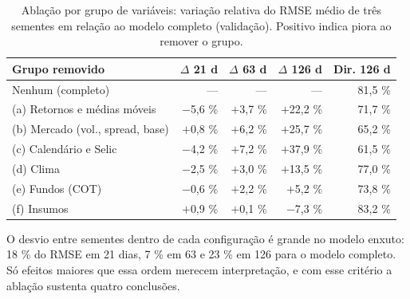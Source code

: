 \begin{table}[htb]
	\centering
	\caption{Ablação por grupo de variáveis: variação relativa do RMSE médio de três sementes em relação ao modelo completo (validação). Positivo indica piora ao remover o grupo.}\label{tab:rq1-ablacao}
	\footnotesize
	\setlength{\tabcolsep}{4pt}
	\begin{tabular}{l r r r r}
		\hline
		\textbf{Grupo removido} & \textbf{$\Delta$ 21 d} & \textbf{$\Delta$ 63 d} & \textbf{$\Delta$ 126 d} & \textbf{Dir. 126 d} \\ \hline
		Nenhum (completo)          & ---     & ---    & ---     & 81,5 \% \\
		(a) Retornos e médias móveis & $-$5,6 \% & $+$3,7 \% & $+$22,2 \% & 71,7 \% \\
		(b) Mercado (vol., spread, base) & $+$0,8 \% & $+$6,2 \% & $+$25,7 \% & 65,2 \% \\
		(c) Calendário e Selic     & $-$4,2 \% & $+$7,2 \% & $+$37,9 \% & 61,5 \% \\
		(d) Clima                  & $-$2,5 \% & $+$3,0 \% & $+$13,5 \% & 77,0 \% \\
		(e) Fundos (COT)           & $-$0,6 \% & $+$2,2 \% & $+$5,2 \%  & 73,8 \% \\
		(f) Insumos                & $+$0,9 \% & $+$0,1 \% & $-$7,3 \%  & 83,2 \% \\ \hline
	\end{tabular}
\end{table}

O desvio entre sementes dentro de cada configuração é grande no modelo enxuto: 18 \% do RMSE em 21 dias, 7 \% em 63 e 23 \% em 126 para o modelo completo. Só efeitos maiores que essa ordem merecem interpretação, e com esse critério a ablação sustenta quatro conclusões.


